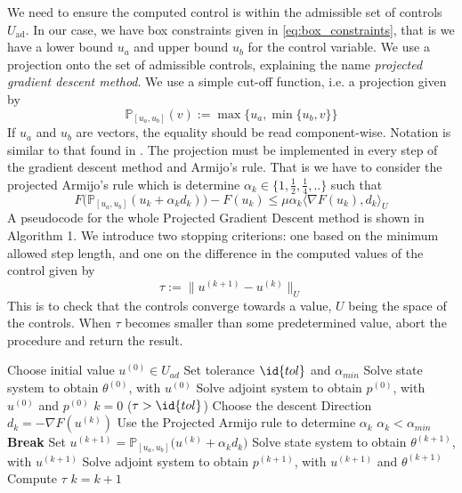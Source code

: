 We need to ensure the computed control is within the admissible set of controls $U_{\textrm{ad}}$. In our case, we have box constraints given in \eqref{eq:box_constraints}, that is we have a lower bound $u_a$ and upper bound $u_b$ for the control variable. We use a projection onto the set of admissible controls, explaining the name \emph{projected gradient descent method}. We use a simple cut-off function, i.e. a projection given by
\begin{equation}
    \label{eq:projection}
    \mathbb{P}_{[u_a,u_b]}(v) := \max \{u_a, \min \{u_b,v \} \}
\end{equation}
If $u_a$ and $u_b$ are vectors, the equality should be read component-wise. Notation is similar to that found in \cite{Algorithms}. The projection must be implemented in every step of the gradient descent method and Armijo's rule. That is we have to consider the projected Armijo's rule which is determine $\alpha_k \in \{1, \frac{1}{2},\frac{1}{4},.. \}$ such that 
\begin{equation*}
    F \bigg (\mathbb{P}_{[u_a,u_b]}(u_k + \alpha_kd_k) \bigg ) - F(u_k) \leq \mu \alpha_k \langle \nabla F(u_k),d_k \rangle_{U}
\end{equation*}
A pseudocode for the whole Projected Gradient Descent method is shown in Algorithm 1. We introduce two stopping criterions: one based on the minimum allowed step length, and one on the difference in the computed values of the control given by 
\begin{equation}
    \label{eq:stopping}
    \tau := \|u^{(k+1)} - u^{(k)}\|_U 
\end{equation}
This is to check that the controls converge towards a value, $U$ being the space of the controls. When $\tau$ becomes smaller than some predetermined value, abort the procedure and return the result.

\begin{codebox}
\li Choose initial value $u^{(0)}\in U_{ad}$
\li Set tolerance $\id{tol}$ and $\alpha_{min}$
\li Solve state system to obtain $\theta^{(0)}$, with $u^{(0)}$
\li Solve adjoint system to obtain $p^{(0)}$, with $u^{(0)}$ and $p^{(0)}$
\li $k=0$
\li \While ($\tau > \id{tol}$)  \Then
\li Choose the descent Direction $d_k = -\nabla F(u^{(k)})$
\li Use the Projected Armijo rule to determine $\alpha_k$
\li \If $\alpha_k < \alpha_{min}$ \Then 
\li \textbf{Break} \End
\li Set $u^{(k+1)} = \mathbb{P}_{[u_a,u_b]}\bigg (u^{(k)} + \alpha_k d_k \bigg )$
\li Solve state system to obtain $\theta^{(k+1)}$, with $u^{(k+1)}$
\li Solve adjoint system to obtain $p^{(k+1)}$, with $u^{(k+1)}$ and $\theta^{(k+1)}$
\li Compute $\tau$
\li $k = k +1$
\end{codebox}

